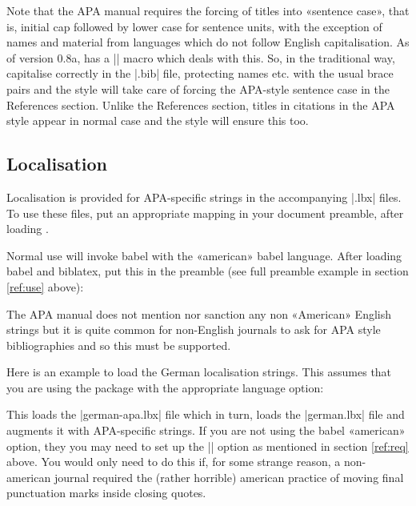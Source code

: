 \documentclass{ltxdockit}
\begin{document}
\begin{ltxcode}
\usepackage[american]{babel}
\usepackage{csquotes}
\usepackage[style=apa]{biblatex}
\end{ltxcode}

\noindent Note that the APA manual requires the forcing of titles into
«sentence case», that is, initial cap followed by lower case for sentence
units, with the exception of names and material from languages which do not
follow English capitalisation. As of version 0.8a,  has a
|\MakeSentenceCase| macro which deals with this. So, in the traditional
\bibtex way, capitalise correctly in the |.bib| file, protecting names etc.
with the usual brace pairs and the style will take care of forcing the
APA-style sentence case in the References section. Unlike the References
section, titles in citations in the APA style appear in normal case and the
style will ensure this too.

\subsection{Localisation}

Localisation is provided for APA-specific strings in the accompanying
|.lbx| files. To use these files, put an appropriate mapping in your
document preamble, after loading .

Normal use will invoke babel with the «american» babel language. After
loading babel and biblatex, put this in the preamble (see full preamble
example in section \ref{ref:use} above):

\begin{ltxcode}
\end{ltxcode}

The APA manual does not mention nor sanction any non «American» English
strings but it is quite common for non-English journals to ask for APA style
bibliographies and so this must be supported.

Here is an example to load the German localisation strings. This assumes
that you are using the  package with the appropriate language
option:

\begin{ltxcode}
\end{ltxcode}

This loads the |german-apa.lbx| file which in turn, loads the |german.lbx|
file and augments it with APA-specific strings. If you are not using the
babel «american» option, they you may need to set up the
|\DeclareQuotePunctuation| option as mentioned in section \ref{ref:req} above.
You would only need to do this if, for some strange reason, a non-american
journal required the (rather horrible) american practice of moving final
punctuation marks inside closing quotes.
\end{document}
